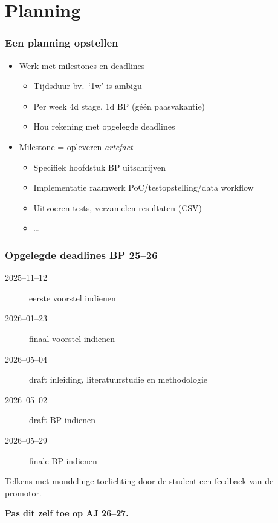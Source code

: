 \documentclass[aspectratio=169]{beamer}
\begin{document}
\section{Planning}

\begin{frame}
  \frametitle{Een planning opstellen}

  \begin{itemize}
    \item Werk met milestones en deadlines
    \begin{itemize}
      \item Tijdsduur bv.\ `1w' is ambigu
      \item Per week 4d stage, 1d BP (géén paasvakantie)
      \item Hou rekening met opgelegde deadlines
    \end{itemize}
    \item Milestone = opleveren \textit{artefact}
    \begin{itemize}
      \item Specifiek hoofdstuk BP uitschrijven
      \item Implementatie raamwerk PoC/testopstelling/data workflow
      \item Uitvoeren tests, verzamelen resultaten (CSV)
      \item \ldots
    \end{itemize}
  \end{itemize}

\end{frame}

\begin{frame}
  \frametitle{Opgelegde deadlines BP 25--26}

  \begin{description}
    \item[2025--11--12] eerste voorstel indienen
    \item[2026--01--23] finaal voorstel indienen
    \item[2026--05--04] draft inleiding, literatuurstudie en methodologie
    \item[2026--05--02] draft BP indienen
    \item[2026--05--29] finale BP indienen
  \end{description}
  \medskip
  Telkens met mondelinge toelichting door de student een feedback van de promotor.
  \medskip

  \textbf{Pas dit zelf toe op AJ 26--27.}

\end{frame}
\end{document}
